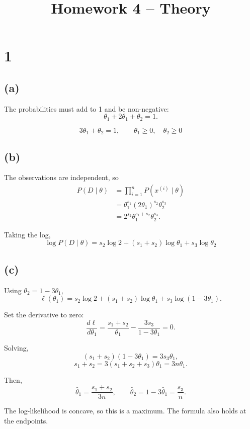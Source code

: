 \documentclass[11pt]{article}
\title{Homework 4 -- Theory}
\author{}
\date{}
\begin{document}
\maketitle

\section*{1}

\subsection*{(a)}

The probabilities must add to 1 and be non-negative:
\[
\theta_1+2\theta_1+\theta_2=1.
\]

\[
\boxed{
3\theta_1+\theta_2=1,\qquad
\theta_1\geq0,\quad\theta_2\geq0
}
\]

\subsection*{(b)}

The observations are independent, so
\[
\begin{aligned}
P(D\mid\theta)
&=\prod_{i=1}^{n}P(x^{(i)}\mid\theta)\\
&=\theta_1^{s_1}(2\theta_1)^{s_2}\theta_2^{s_3}\\
&=2^{s_2}\theta_1^{s_1+s_2}\theta_2^{s_3}.
\end{aligned}
\]

Taking the log,
\[
\boxed{
\log P(D\mid\theta)
=s_2\log2+(s_1+s_2)\log\theta_1
+s_3\log\theta_2
}
\]

\subsection*{(c)}

Using $\theta_2=1-3\theta_1$,
\[
\ell(\theta_1)
=s_2\log2+(s_1+s_2)\log\theta_1
+s_3\log(1-3\theta_1).
\]

Set the derivative to zero:
\[
\frac{d\ell}{d\theta_1}
=\frac{s_1+s_2}{\theta_1}
-\frac{3s_3}{1-3\theta_1}=0.
\]

Solving,
\[
(s_1+s_2)(1-3\theta_1)=3s_3\theta_1,
\]
\[
s_1+s_2=3(s_1+s_2+s_3)\theta_1
=3n\theta_1.
\]

Then,
\[
\hat\theta_1=\frac{s_1+s_2}{3n},
\qquad
\hat\theta_2=1-3\hat\theta_1=\frac{s_3}{n}.
\]

The log-likelihood is concave, so this is a maximum.
The formula also holds at the endpoints.
\end{document}
